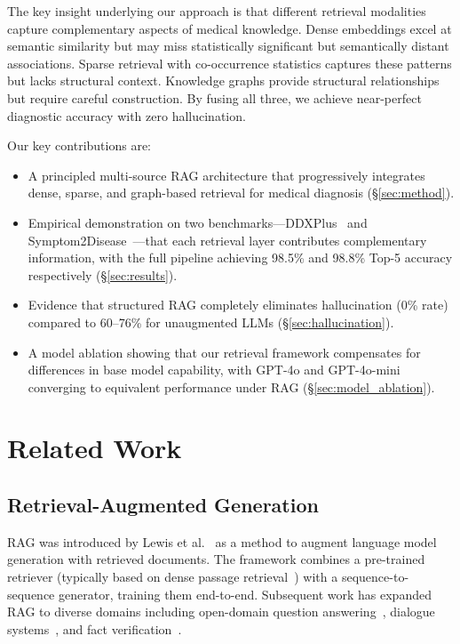 \documentclass[review]{elsarticle}
\begin{document}
The key insight underlying our approach is that different retrieval modalities capture complementary aspects of medical knowledge. Dense embeddings excel at semantic similarity but may miss statistically significant but semantically distant associations. Sparse retrieval with co-occurrence statistics captures these patterns but lacks structural context. Knowledge graphs provide structural relationships but require careful construction. By fusing all three, we achieve near-perfect diagnostic accuracy with zero hallucination.

Our key contributions are:
\begin{itemize}
    \item A principled multi-source RAG architecture that progressively integrates dense, sparse, and graph-based retrieval for medical diagnosis (\S\ref{sec:method}).
    \item Empirical demonstration on two benchmarks---DDXPlus~\cite{fansi2022ddxplus} and Symptom2Disease~\cite{gretelai_s2d}---that each retrieval layer contributes complementary information, with the full pipeline achieving 98.5\% and 98.8\% Top-5 accuracy respectively (\S\ref{sec:results}).
    \item Evidence that structured RAG completely eliminates hallucination (0\% rate) compared to 60--76\% for unaugmented LLMs (\S\ref{sec:hallucination}).
    \item A model ablation showing that our retrieval framework compensates for differences in base model capability, with GPT-4o and GPT-4o-mini converging to equivalent performance under RAG (\S\ref{sec:model_ablation}).
\end{itemize}

\section{Related Work}
\label{sec:related}

\subsection{Retrieval-Augmented Generation}

RAG was introduced by Lewis et al.~\cite{lewis2020retrieval} as a method to augment language model generation with retrieved documents. The framework combines a pre-trained retriever (typically based on dense passage retrieval~\cite{karpukhin2020dense}) with a sequence-to-sequence generator, training them end-to-end. Subsequent work has expanded RAG to diverse domains including open-domain question answering~\cite{izacard2021leveraging}, dialogue systems~\cite{shuster2021retrieval}, and fact verification~\cite{thorne2018fever}.
\end{document}
